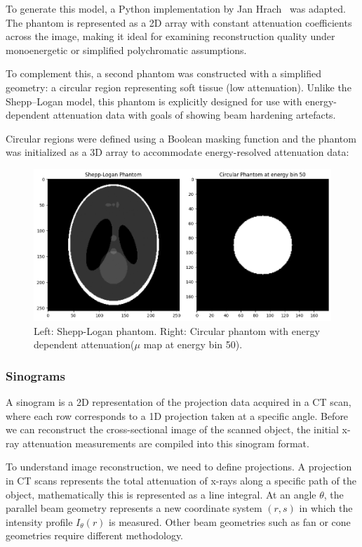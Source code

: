 \documentclass{article}
\theoremstyle{definition}
\begin{document}
To generate this model, a Python implementation by Jan Hrach~\cite{HrachovecPhantom} was adapted. The phantom is represented as a 2D array with constant attenuation coefficients across the image, making it ideal for examining reconstruction quality under monoenergetic or simplified polychromatic assumptions.

To complement this, a second phantom was constructed with a simplified geometry: a circular region representing soft tissue (low attenuation). Unlike the Shepp–Logan model, this phantom is explicitly designed for use with energy-dependent attenuation data with goals of showing beam hardening artefacts.

Circular regions were defined using a Boolean masking function and the phantom was initialized as a 3D array to accommodate energy-resolved attenuation data:

\begin{figure}[H]
	\includegraphics[width=\linewidth]{simplephantom.png}
	\caption{Left: Shepp-Logan phantom. Right: Circular phantom with energy dependent attenuation($\mu$ map at energy bin 50).}
	\label{fig:phantoms}
\end{figure}

\subsubsection{Sinograms}
A sinogram is a 2D representation of the projection data acquired in a CT scan, where each row corresponds to a 1D projection taken at a specific angle. Before we can reconstruct the cross-sectional image of the scanned object, the initial x-ray attenuation measurements are compiled into this sinogram format.

To understand image reconstruction, we need to define projections. A projection in CT scans represents the total attenuation of x-rays along a specific path of the object, mathematically this is represented as a line integral. At an angle $\theta$, the parallel beam geometry represents a new coordinate system $(r, s)$ in which the intensity profile $I_\theta (r)$ is measured. Other beam geometries such as fan or cone geometries require different methodology.
\end{document}
